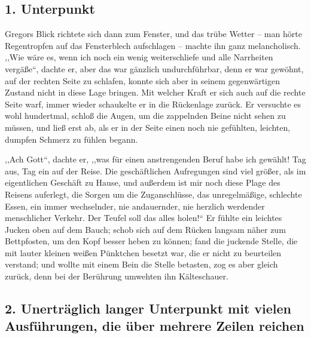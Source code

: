 \documentclass[]{zchinr}
\begin{document}
\subsection{1. Unterpunkt}

Gregors Blick richtete sich dann zum Fenster, und das trübe Wetter -- man hörte Regentropfen auf das Fensterblech aufschlagen -- machte ihn ganz melancholisch. ,,Wie wäre es, wenn ich noch ein wenig weiterschliefe und alle Narrheiten vergäße``, dachte er, aber das war gänzlich undurchführbar, denn er war gewöhnt, auf der rechten Seite zu schlafen, konnte sich aber in seinem gegenwärtigen Zustand nicht in diese Lage bringen. Mit welcher Kraft er sich auch auf die rechte Seite warf, immer wieder schaukelte er in die Rückenlage zurück. Er versuchte es wohl hundertmal, schloß die Augen, um die zappelnden Beine nicht sehen zu müssen, und ließ erst ab, als er in der Seite einen noch nie gefühlten, leichten, dumpfen Schmerz zu fühlen begann.

,,Ach Gott``, dachte er, ,,was für einen anstrengenden Beruf habe ich gewählt! Tag aus, Tag ein auf der Reise. Die geschäftlichen Aufregungen sind viel größer, als im eigentlichen Geschäft zu Hause, und außerdem ist mir noch diese Plage des Reisens auferlegt, die Sorgen um die Zuganschlüsse, das unregelmäßige, schlechte Essen, ein immer wechselnder, nie andauernder, nie herzlich werdender menschlicher Verkehr. Der Teufel soll das alles holen!{}`` Er fühlte ein leichtes Jucken oben auf dem Bauch; schob sich auf dem Rücken langsam näher zum Bettpfosten, um den Kopf besser heben zu können; fand die juckende Stelle, die mit lauter kleinen weißen Pünktchen besetzt war, die er nicht zu beurteilen verstand; und wollte mit einem Bein die Stelle betasten, zog es aber gleich zurück, denn bei der Berührung umwehten ihn Kälteschauer.

\subsection{2. Unerträglich langer Unterpunkt mit vielen Ausführungen, die über mehrere Zeilen reichen}
\end{document}
